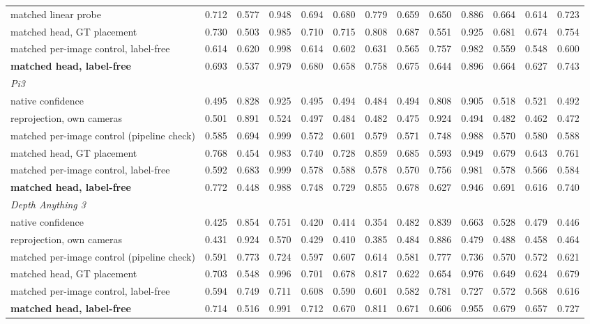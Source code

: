 \begin{tabular}{lcccccccccccc}
matched linear probe & 0.712 & 0.577 & 0.948 & 0.694 & 0.680 & 0.779 & 0.659 & 0.650 & 0.886 & 0.664 & 0.614 & 0.723 \\
matched head, GT placement & 0.730 & 0.503 & 0.985 & 0.710 & 0.715 & 0.808 & 0.687 & 0.551 & 0.925 & 0.681 & 0.674 & 0.754 \\
matched per-image control, label-free & 0.614 & 0.620 & 0.998 & 0.614 & 0.602 & 0.631 & 0.565 & 0.757 & 0.982 & 0.559 & 0.548 & 0.600 \\
\textbf{matched head, label-free} & 0.693 & 0.537 & 0.979 & 0.680 & 0.658 & 0.758 & 0.675 & 0.644 & 0.896 & 0.664 & 0.627 & 0.743 \\
\multicolumn{13}{l}{\emph{Pi3}} \\
native confidence & 0.495 & 0.828 & 0.925 & 0.495 & 0.494 & 0.484 & 0.494 & 0.808 & 0.905 & 0.518 & 0.521 & 0.492 \\
reprojection, own cameras & 0.501 & 0.891 & 0.524 & 0.497 & 0.484 & 0.482 & 0.475 & 0.924 & 0.494 & 0.482 & 0.462 & 0.472 \\
matched per-image control (pipeline check) & 0.585 & 0.694 & 0.999 & 0.572 & 0.601 & 0.579 & 0.571 & 0.748 & 0.988 & 0.570 & 0.580 & 0.588 \\
matched head, GT placement & 0.768 & 0.454 & 0.983 & 0.740 & 0.728 & 0.859 & 0.685 & 0.593 & 0.949 & 0.679 & 0.643 & 0.761 \\
matched per-image control, label-free & 0.592 & 0.683 & 0.999 & 0.578 & 0.588 & 0.578 & 0.570 & 0.756 & 0.981 & 0.578 & 0.566 & 0.584 \\
\textbf{matched head, label-free} & 0.772 & 0.448 & 0.988 & 0.748 & 0.729 & 0.855 & 0.678 & 0.627 & 0.946 & 0.691 & 0.616 & 0.740 \\
\multicolumn{13}{l}{\emph{Depth Anything 3}} \\
native confidence & 0.425 & 0.854 & 0.751 & 0.420 & 0.414 & 0.354 & 0.482 & 0.839 & 0.663 & 0.528 & 0.479 & 0.446 \\
reprojection, own cameras & 0.431 & 0.924 & 0.570 & 0.429 & 0.410 & 0.385 & 0.484 & 0.886 & 0.479 & 0.488 & 0.458 & 0.464 \\
matched per-image control (pipeline check) & 0.591 & 0.773 & 0.724 & 0.597 & 0.607 & 0.614 & 0.581 & 0.777 & 0.736 & 0.570 & 0.572 & 0.621 \\
matched head, GT placement & 0.703 & 0.548 & 0.996 & 0.701 & 0.678 & 0.817 & 0.622 & 0.654 & 0.976 & 0.649 & 0.624 & 0.679 \\
matched per-image control, label-free & 0.594 & 0.749 & 0.711 & 0.608 & 0.590 & 0.601 & 0.582 & 0.781 & 0.727 & 0.572 & 0.568 & 0.616 \\
\textbf{matched head, label-free} & 0.714 & 0.516 & 0.991 & 0.712 & 0.670 & 0.811 & 0.671 & 0.606 & 0.955 & 0.679 & 0.657 & 0.727 \\
\bottomrule
\end{tabular}
